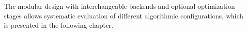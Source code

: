 The modular design with interchangeable backends and optional optimization
stages allows systematic evaluation of different algorithmic configurations,
which is presented in the following chapter.

















